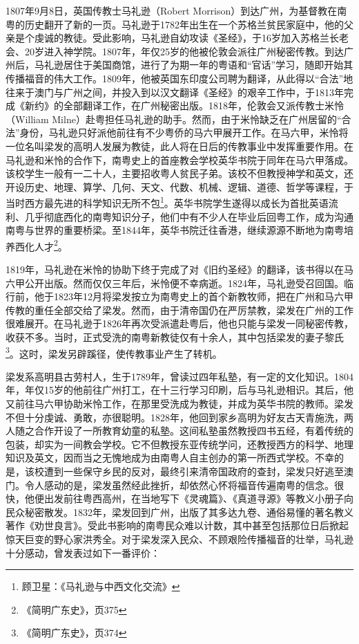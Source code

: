 1807年9月8日，英国传教士马礼逊（Robert Morrison）到达广州，为基督教在南粤的历史翻开了新的一页。马礼逊于1782年出生在一个苏格兰贫民家庭中，他的父亲是个虔诚的教徒。受此影响，马礼逊自幼攻读《圣经》，于16岁加入苏格兰长老会、20岁进入神学院。1807年，年仅25岁的他被伦敦会派往广州秘密传教。到达广州后，马礼逊居住于美国商馆，进行了为期一年的粤语和“官话”学习，随即开始其传播福音的伟大工作。1809年，他被英国东印度公司聘为翻译，从此得以“合法”地往来于澳门与广州之间，并投入到以汉文翻译《圣经》的艰辛工作中，于1813年完成《新约》的全部翻译工作，在广州秘密出版。1818年，伦敦会又派传教士米怜（William Milne）赴粤担任马礼逊的助手。然而，由于米怜缺乏在广州居留的“合法”身份，马礼逊只好派他前往有不少粤侨的马六甲展开工作。在马六甲，米怜将一位名叫梁发的高明人发展为教徒，此人将在日后的传教事业中发挥重要作用。在马礼逊和米怜的合作下，南粤史上的首座教会学校英华书院于同年在马六甲落成。该校学生一般有一二十人，主要招收粤人贫民子弟。该校不但教授神学和英文，还开设历史、地理、算学、几何、天文、代数、机械、逻辑、道德、哲学等课程，于当时西方最先进的科学知识无所不包\footnote{顾卫星：《马礼逊与中西文化交流》}。英华书院学生遂得以成长为首批英语流利、几乎彻底西化的南粤知识分子，他们中有不少人在毕业后回粤工作，成为沟通南粤与世界的重要桥梁。至1844年，英华书院迁往香港，继续源源不断地为南粤培养西化人才\footnote{《简明广东史》，页375}。

1819年，马礼逊在米怜的协助下终于完成了对《旧约圣经》的翻译，该书得以在马六甲公开出版。然而仅仅三年后，米怜便不幸病逝。1824年，马礼逊受召回国。临行前，他于1823年12月将梁发按立为南粤史上的首个新教牧师，把在广州和马六甲传教的重任全部交给了梁发。然而，由于清帝国仍在严厉禁教，梁发在广州的工作很难展开。在马礼逊于1826年再次受派遣赴粤后，他也只能与梁发一同秘密传教，收获不多。当时，正式受洗的南粤新教徒仅有十余人，其中包括梁发的妻子黎氏\footnote{《简明广东史》，页374}。这时，梁发另辟蹊径，使传教事业产生了转机。

梁发系高明县古劳村人，生于1789年，曾读过四年私塾，有一定的文化知识。1804年，年仅15岁的他前往广州打工，在十三行学习印刷，后与马礼逊相识。其后，他又前往马六甲协助米怜工作，在那里受洗成为教徒，并成为英华书院的教师。梁发不但十分虔诚、勇敢，亦很聪明。1828年，他回到家乡高明为好友古天青施洗，两人随之合作开设了一所教育幼童的私塾。这间私塾虽然教授四书五经，有着传统的包装，却实为一间教会学校。它不但教授东亚传统学问，还教授西方的科学、地理知识及英文，因而当之无愧地成为由南粤人自主创办的第一所西式学校。不幸的是，该校遭到一些保守乡民的反对，最终引来清帝国政府的查封，梁发只好逃至澳门。令人感动的是，梁发虽然经此挫折，却依然心怀将福音传遍南粤的信念。很快，他便出发前往粤西高州，在当地写下《灵魂篇》、《真道寻源》等教义小册子向民众秘密散发。1832年，梁发回到广州，出版了其多达九卷、通俗易懂的著名教义著作《劝世良言》。受此书影响的南粤民众难以计数，其中甚至包括那位日后掀起惊天巨变的野心家洪秀全。对于梁发深入民众、不顾艰险传播福音的壮举，马礼逊十分感动，曾发表过如下一番评价：

